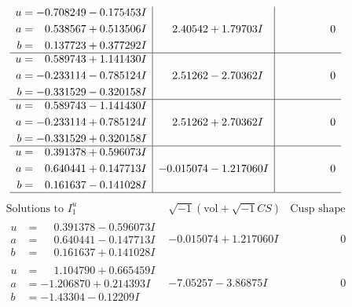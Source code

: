 \documentclass[1p]{elsarticle_modified}
\theoremstyle{definition}
\newcommand{\I}{\sqrt{-1}}
\begin{document}
$$\begin{array}{c|c|c}
\begin{aligned}
u &= -0.708249 - 0.175453 I \\
a &= \phantom{-}0.538567 + 0.513506 I \\
b &= \phantom{-}0.137723 + 0.377292 I\end{aligned}
 & \phantom{-}2.40542 + 1.79703 I & \phantom{-0.000000 } 0 \\ \hline\begin{aligned}
u &= \phantom{-}0.589743 + 1.141430 I \\
a &= -0.233114 - 0.785124 I \\
b &= -0.331529 - 0.320158 I\end{aligned}
 & \phantom{-}2.51262 - 2.70362 I & \phantom{-0.000000 } 0 \\ \hline\begin{aligned}
u &= \phantom{-}0.589743 - 1.141430 I \\
a &= -0.233114 + 0.785124 I \\
b &= -0.331529 + 0.320158 I\end{aligned}
 & \phantom{-}2.51262 + 2.70362 I & \phantom{-0.000000 } 0 \\ \hline\begin{aligned}
u &= \phantom{-}0.391378 + 0.596073 I \\
a &= \phantom{-}0.640441 + 0.147713 I \\
b &= \phantom{-}0.161637 - 0.141028 I\end{aligned}
 & -0.015074 - 1.217060 I & \phantom{-0.000000 } 0\\
 \hline 
 \end{array}$$\newpage$$\begin{array}{c|c|c}  
\text{Solutions to }I^u_{1}& \I (\text{vol} + \sqrt{-1}CS) & \text{Cusp shape}\\
 \hline 
\begin{aligned}
u &= \phantom{-}0.391378 - 0.596073 I \\
a &= \phantom{-}0.640441 - 0.147713 I \\
b &= \phantom{-}0.161637 + 0.141028 I\end{aligned}
 & -0.015074 + 1.217060 I & \phantom{-0.000000 } 0 \\ \hline\begin{aligned}
u &= \phantom{-}1.104790 + 0.665459 I \\
a &= -1.206870 + 0.214393 I \\
b &= -1.43304 - 0.12209 I\end{aligned}
 & -7.05257 - 3.86875 I & \phantom{-0.000000 } 0 \\ \hline\begin{aligned}

\end{aligned}
\end{array}$$
\end{document}
